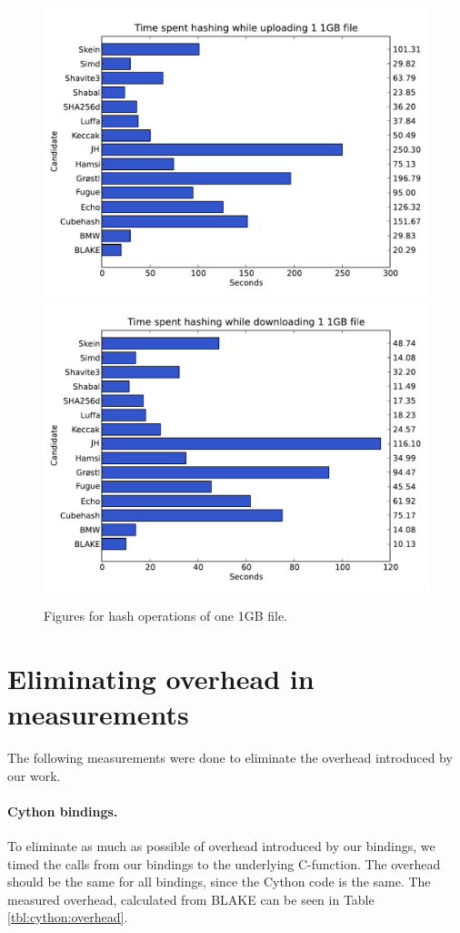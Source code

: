 \documentclass[english,12pt,a4paper]{book}
\begin{document}
\begin{figure}[h!]
    \centering
    \includegraphics[width=0.9\columnwidth]
        {graphs/Timespenthashingwhileuploading11GBfile.pdf}
    \includegraphics[width=0.9\columnwidth]
        {graphs/Timespenthashingwhiledownloading11GBfile.pdf}
    \caption{Figures for hash operations of one 1GB file.}
    \label{fig:graph:11gb}
\end{figure}

\section{Eliminating overhead in measurements}

The following measurements were done to eliminate the overhead introduced by
our work.

\paragraph{Cython bindings.}
To eliminate as much as possible of overhead introduced by our bindings, we
timed the calls from our bindings to the underlying C-function. The overhead
should be the same for all bindings, since the Cython code is the same. The
measured overhead, calculated from BLAKE can be seen in Table
\ref{tbl:cython:overhead}.
\end{document}
